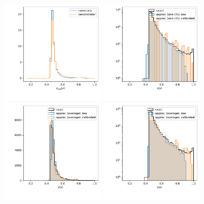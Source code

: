 \begin{figure}
  \includegraphics[width=0.45\textwidth]{figures/appendix/pointwise_tuning_full/calibration_histos_one_smart_rf.pdf}%
  \includegraphics[width=0.45\textwidth]{figures/appendix/pointwise_tuning_full/s_histos_one_log_smart_rf.pdf}\\%
  \includegraphics[width=0.45\textwidth]{figures/appendix/pointwise_tuning_full/s_histos_average_smart_rf.pdf}%
  \includegraphics[width=0.45\textwidth]{figures/appendix/pointwise_tuning_full/s_histos_average_log_smart_rf.pdf}%

\end{figure}
